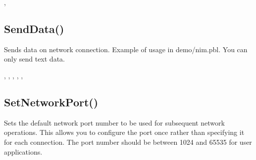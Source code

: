 \documentclass[letterpaper,10pt,english]{sphinxmanual}
\begin{document}
\sphinxAtStartPar
{}

\sphinxAtStartPar
{}, 

\ignorespaces 

\subsection{SendData()}
\label{\detokenize{reference/peblstream:senddata}}\label{\detokenize{reference/peblstream:index-31}}
\sphinxAtStartPar
{}

\sphinxAtStartPar
{}

\sphinxAtStartPar
Sends data on network connection.  Example of   usage in demo/nim.pbl. You can only send text data.

\sphinxAtStartPar
{}

\begin{sphinxVerbatim}[commandchars=\\\{\}]
\end{sphinxVerbatim}

\sphinxAtStartPar
{}

\sphinxAtStartPar
{}, , , , , 

\ignorespaces 

\subsection{SetNetworkPort()}
\label{\detokenize{reference/peblstream:setnetworkport}}\label{\detokenize{reference/peblstream:index-32}}
\sphinxAtStartPar
{}

\sphinxAtStartPar
{}

\sphinxAtStartPar
Sets the default network port number to be used for subsequent network operations. This allows you to configure the port once rather than specifying it for each connection. The port number should be between 1024 and 65535 for user applications.
\end{document}
